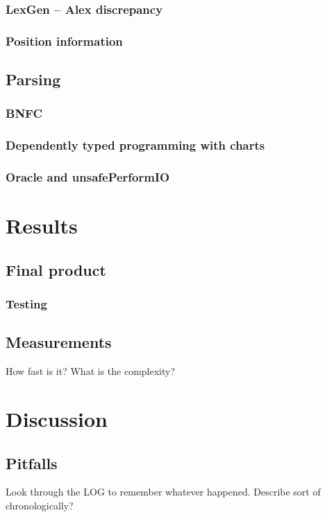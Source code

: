 \documentclass[a4paper,12pt,twosided]{report}
\begin{document}
\subsection{LexGen -- Alex discrepancy}
\subsection{Position information}

\section{Parsing}
\subsection{BNFC}
\subsection{Dependently typed programming with charts}
\subsection{Oracle and unsafePerformIO}

%
%

\chapter{Results}

\section{Final product}
\subsection{Testing}

\section{Measurements}
How fast is it? What is the complexity?

%
%
\chapter{Discussion}

\section{Pitfalls}
Look through the LOG to remember whatever happened. Describe sort of chronologically?
\end{document}
